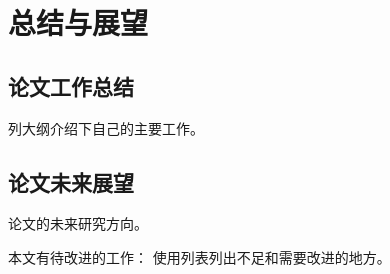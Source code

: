 \chapter{总结与展望}
\section{论文工作总结}

列大纲介绍下自己的主要工作。
 

\section{论文未来展望}


论文的未来研究方向。

本文有待改进的工作： 
使用列表列出不足和需要改进的地方。



\makeatletter
\@openrighttrue
\makeatother